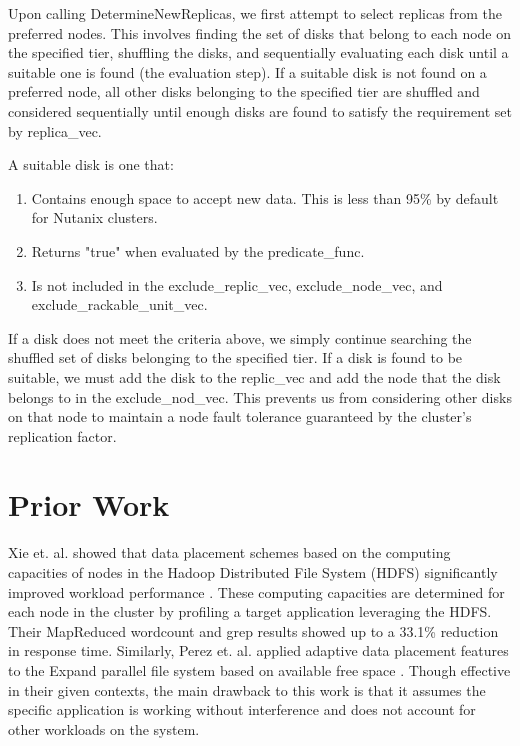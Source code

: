 \documentclass[12pt]{article}
\begin{document}
    Upon calling DetermineNewReplicas, we first attempt to select replicas from
    the preferred nodes. This involves finding the set of disks that belong to
    each node on the specified tier, shuffling the disks, and sequentially
    evaluating each disk until a suitable one is found (the evaluation step).
    If a suitable disk is not found on a preferred node, all other disks
    belonging to the specified tier are shuffled and considered sequentially
    until enough disks are found to satisfy the requirement set by replica\_vec.

    A suitable disk is one that:

    \begin{enumerate}
      \item Contains enough space to accept new data. This is less than 95\% by
            default for Nutanix clusters.  \item Returns "true" when evaluated by the
            predicate\_func.
      \item Is not included in the exclude\_replic\_vec, exclude\_node\_vec,
            and exclude\_rackable\_unit\_vec.
    \end{enumerate}

    If a disk does not meet the criteria above, we simply continue searching
    the shuffled set of disks belonging to the specified tier. If a disk is
    found to be suitable, we must add the disk to the replic\_vec and add the
    node that the disk belongs to in the exclude\_nod\_vec. This prevents us
    from considering other disks on that node to maintain a node fault
    tolerance guaranteed by the cluster's replication factor.


\section{Prior Work}

Xie et. al. showed that data placement schemes based on the computing
capacities of nodes in the Hadoop Distributed File System (HDFS) significantly
improved workload performance \cite{hdfs2008}. These computing capacities are
determined for each node in the cluster by profiling a target application
leveraging the
HDFS. Their MapReduced wordcount and grep results showed up to a 33.1\%
reduction in response time. Similarly, Perez et. al. applied adaptive data
placement features to the Expand parallel file system based on available free
space \cite{perez2003}. Though effective in their given contexts, the main drawback to this
work is that it assumes the specific application is working without
interference and does not account for other workloads on the system.
\end{document}
